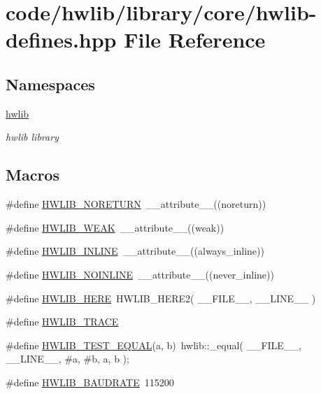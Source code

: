 \hypertarget{hwlib-defines_8hpp}{}\section{code/hwlib/library/core/hwlib-\/defines.hpp File Reference}
\label{hwlib-defines_8hpp}
\subsection*{Namespaces}
\begin{DoxyCompactItemize}
\item 
 \hyperlink{namespacehwlib}{hwlib}
\begin{DoxyCompactList}\small\item\em hwlib library \end{DoxyCompactList}\end{DoxyCompactItemize}
\subsection*{Macros}
\begin{DoxyCompactItemize}
\item 
\#define \hyperlink{hwlib-defines_8hpp_aef311f1f416fdcbd1fa22376dcc01029}{H\+W\+L\+I\+B\+\_\+\+N\+O\+R\+E\+T\+U\+RN}~\+\_\+\+\_\+attribute\+\_\+\+\_\+((noreturn))
\item 
\#define \hyperlink{hwlib-defines_8hpp_a04be4340016df60d6636c1d1c6d94fc9}{H\+W\+L\+I\+B\+\_\+\+W\+E\+AK}~\+\_\+\+\_\+attribute\+\_\+\+\_\+((weak))
\item 
\#define \hyperlink{hwlib-defines_8hpp_a520a8905adc71f1757aea4ce05183585}{H\+W\+L\+I\+B\+\_\+\+I\+N\+L\+I\+NE}~\+\_\+\+\_\+attribute\+\_\+\+\_\+((always\+\_\+inline))
\item 
\#define \hyperlink{hwlib-defines_8hpp_a2bec10dcdff9c6b29f603813007f2ffa}{H\+W\+L\+I\+B\+\_\+\+N\+O\+I\+N\+L\+I\+NE}~\+\_\+\+\_\+attribute\+\_\+\+\_\+((never\+\_\+inline))
\item 
\#define \hyperlink{hwlib-defines_8hpp_a360fe3b1713068844a760bed1aa1384a}{H\+W\+L\+I\+B\+\_\+\+H\+E\+RE}~H\+W\+L\+I\+B\+\_\+\+H\+E\+R\+E2( \+\_\+\+\_\+\+F\+I\+L\+E\+\_\+\+\_\+, \+\_\+\+\_\+\+L\+I\+N\+E\+\_\+\+\_\+ )
\item 
\#define \hyperlink{hwlib-defines_8hpp_a536d8e892418f0e4127db75a6f653add}{H\+W\+L\+I\+B\+\_\+\+T\+R\+A\+CE}
\item 
\#define \hyperlink{hwlib-defines_8hpp_aad56b336cfbb41a3f3c76aa44ea90af2}{H\+W\+L\+I\+B\+\_\+\+T\+E\+S\+T\+\_\+\+E\+Q\+U\+AL}(a,  b)~hwlib\+::\+\_\+equal( \+\_\+\+\_\+\+F\+I\+L\+E\+\_\+\+\_\+, \+\_\+\+\_\+\+L\+I\+N\+E\+\_\+\+\_\+, \#a, \#b, a, b );
\item 
\#define \hyperlink{hwlib-defines_8hpp_a6023302b4614de7cfe0d8596b3ecec13}{H\+W\+L\+I\+B\+\_\+\+B\+A\+U\+D\+R\+A\+TE}~115200
\end{DoxyCompactItemize}


